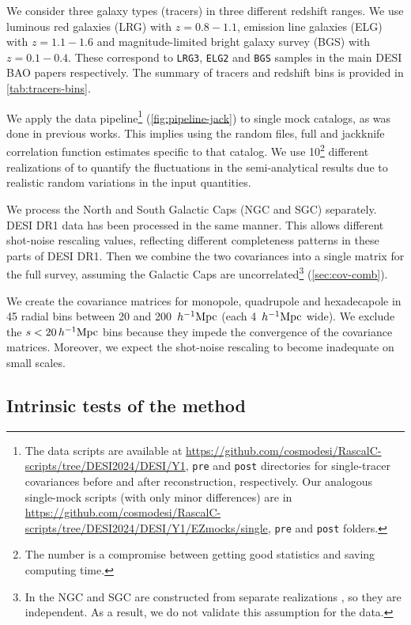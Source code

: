We consider three galaxy types (tracers) in three different redshift ranges.
We use luminous red galaxies (LRG) with $z=0.8-1.1$, emission line galaxies (ELG) \citep{ELG.TS.Raichoor.2023} with $z=1.1-1.6$ and magnitude-limited bright galaxy survey (BGS) \citep{BGS.TS.Hahn.2023} with $z=0.1-0.4$.
These correspond to {\tt LRG3}, {\tt ELG2} and {\tt BGS} samples in the main DESI BAO papers \citep{DESI2024.III.KP4,DESI2024.VI.KP7A} respectively.
The summary of tracers and redshift bins is provided in \cref{tab:tracers-bins}.

We apply the data pipeline\footnote{The data scripts are available at \url{https://github.com/cosmodesi/RascalC-scripts/tree/DESI2024/DESI/Y1}, {\tt pre} and {\tt post} directories for single-tracer covariances before and after reconstruction, respectively.
Our analogous single-mock scripts (with only minor differences) are in \url{https://github.com/cosmodesi/RascalC-scripts/tree/DESI2024/DESI/Y1/EZmocks/single}, {\tt pre} and {\tt post} folders.} (\cref{fig:pipeline-jack}) to single mock catalogs, as was done in previous works.
This implies using the random files, full and jackknife correlation function estimates specific to that catalog.
We use 10\footnote{The number is a compromise between getting good statistics and saving computing time.} different realizations of \ezmocks{} to quantify the fluctuations in the semi-analytical results due to realistic random variations in the input quantities.

We process the North and South Galactic Caps (NGC and SGC) separately.
DESI DR1 data has been processed in the same manner.
This allows different shot-noise rescaling values, reflecting different completeness patterns in these parts of DESI DR1.
Then we combine the two covariances into a single matrix for the full survey, assuming the Galactic Caps are uncorrelated\footnote{In the \ezmocks{} NGC and SGC are constructed from separate realizations \cite{KP3s8-Zhao}, so they are independent. As a result, we do not validate this assumption for the data.} (\cref{sec:cov-comb}).

We create the covariance matrices for monopole, quadrupole and hexadecapole in 45 radial bins between 20 and 200~$h^{-1}{\rm Mpc}$ (each 4~$h^{-1}{\rm Mpc}$ wide).
We exclude the $s<20\,h^{-1}{\rm Mpc}$ bins because they impede the convergence of the covariance matrices.
Moreover, we expect the shot-noise rescaling to become inadequate on small scales.

\subsection{Intrinsic tests of the method}
\label{sec:consistency-checks}

